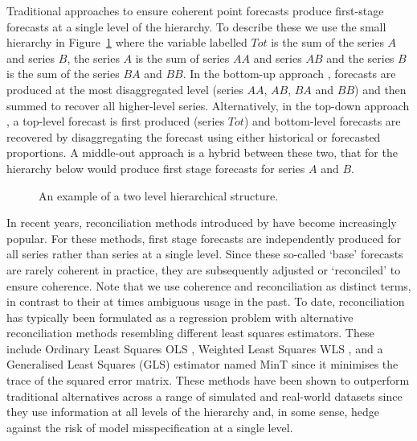 \documentclass[a4paper, 11pt]{article}
\theoremstyle{definition}
\begin{document}
Traditional approaches to ensure coherent point forecasts produce first-stage forecasts at a single level of the hierarchy. To describe these we use the small hierarchy in Figure~\ref{fig1} where the variable labelled $Tot$ is the sum of the series $A$ and series $B$, the series $A$ is the sum of series $AA$ and series $AB$ and the series $B$ is the sum of the series $BA$ and $BB$. In the bottom-up approach \citep{Dunn1976}, forecasts are produced at the most disaggregated level (series $AA$, $AB$, $BA$ and $BB$) and then summed to recover all higher-level series. Alternatively, in the top-down approach \citep{Gross1990}, a top-level forecast is first produced (series $Tot$) and bottom-level forecasts are recovered by disaggregating the forecast using either historical or forecasted proportions. A middle-out approach is a hybrid between these two, that for the hierarchy below would produce first stage forecasts for series $A$ and $B$.

\begin{figure}[H]
	\begin{center}
		 
		 
		\qobitree
	\end{center}
	\caption{An example of a two level hierarchical structure.}\label{fig1}
\end{figure}

In recent years, reconciliation methods introduced by \citet{Hyndman2011} have become increasingly popular. For these methods, first stage forecasts are independently produced for all series rather than series at a single level. Since these so-called `base' forecasts are rarely coherent in practice, they are subsequently adjusted or `reconciled' to ensure coherence.  Note that we use coherence and reconciliation as distinct terms, in contrast to their at times ambiguous usage in the past. To date, reconciliation has typically been formulated as a regression problem with alternative reconciliation methods resembling different least squares estimators. These include Ordinary Least Squares {OLS} \citep{AthEtAl2009}, Weighted Least Squares {WLS} \citep{AthEtAl2017}, and a Generalised Least Squares (GLS) estimator \citep{Wickramasuriya2017} named MinT since it minimises the trace of the squared error matrix. These methods have been shown to outperform traditional alternatives across a range of simulated and real-world datasets \citep{Hyndman2011,VanErven2015a,Wickramasuriya2017} since they use information at all levels of the hierarchy and, in some sense, hedge against the risk of model misspecification at a single level.
\end{document}
